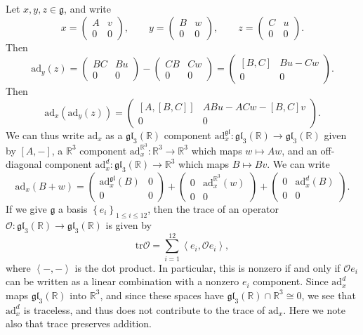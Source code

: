 \documentclass[11pt, letterpaper]{article}
\theoremstyle{plain}
\begin{document}
Let $x,y,z\in \mathfrak{g} $, and write
\[
	x = \begin{pmatrix}
	A & v \\
	0 & 0
	\end{pmatrix},\qquad y=\begin{pmatrix}
	B & w \\
	0 & 0
	\end{pmatrix},\qquad z=\begin{pmatrix}
	C & u \\
	0 & 0
	\end{pmatrix}
.\]
Then
\[
	\mathrm{ad} _y(z) = \begin{pmatrix}
	BC & Bu \\
	0 & 0
	\end{pmatrix}-\begin{pmatrix}
	CB & Cw \\
	0 & 0
	\end{pmatrix}=\begin{pmatrix}
	\left[B,C\right] & Bu-Cw \\
	0 & 0
	\end{pmatrix}
.\]
Then
\[
	\mathrm{ad} _x(\mathrm{ad} _y(z)) = \begin{pmatrix}
	\left[ A,\left[ B,C \right]  \right]  & ABu-ACw -\left[ B,C \right] v \\
	0 & 0
	\end{pmatrix}
.\]
We can thus write $\mathrm{ad} _x$ as a $\mathfrak{gl} _3(\mathbb{R} )$ component $\mathrm{ad}_x^{\mathfrak{gl} } : \mathfrak{gl} _3(\mathbb{R} ) \to \mathfrak{gl} _3(\mathbb{R} )$ given by $[A,-]$, a $\mathbb{R} ^3$ component $\mathrm{ad} _x^{\mathbb{R} ^3} : \mathbb{R} ^3 \to \mathbb{R} ^3$ which maps $w\mapsto Aw$, and an off-diagonal component $\mathrm{ad}^d_x : \mathfrak{gl} _3(\mathbb{R} ) \to \mathbb{R} ^3$ which maps $B\mapsto Bv$. We can write
\[
	\mathrm{ad}_x(B+w) = \begin{pmatrix}
	\mathrm{ad}_x^{\mathfrak{gl} } (B) & 0 \\
	0 & 0
	\end{pmatrix}+ \begin{pmatrix}
	0 & \mathrm{ad} _x^{\mathbb{R} ^3} (w) \\
	0 & 0
	\end{pmatrix}+ \begin{pmatrix}
	0 & \mathrm{ad}_x^{d} (B) \\
	0 & 0
	\end{pmatrix}
.\]
If we give $\mathfrak{g} $ a basis $\left\{ e_i \right\}_{1\leq i\leq 12} $, then the trace of an operator $\mathcal{O} : \mathfrak{gl} _3(\mathbb{R} ) \to \mathfrak{gl} _3(\mathbb{R} ) $ is given by
\[
	\mathrm{tr} \mathcal{O} =\sum_{i=1}^{12} \left\langle e_i, \mathcal{O} e_i \right\rangle 
,\]
where $\left\langle -,- \right\rangle $ is the dot product. In particular, this is nonzero if and only if $\mathcal{O} e_i $ can be written as a linear combination with a nonzero $e_i$ component. Since $\mathrm{ad} _x^d$ maps $\mathfrak{gl} _3(\mathbb{R} )$ into $\mathbb{R} ^3$, and since these spaces have $\mathfrak{gl} _3(\mathbb{R} ) \cap \mathbb{R} ^3 \cong 0$, we see that $\mathrm{ad}_x^d$ is traceless, and thus does not contribute to the trace of $\mathrm{ad} _x$. Here we note also that trace preserves addition.
\end{document}
